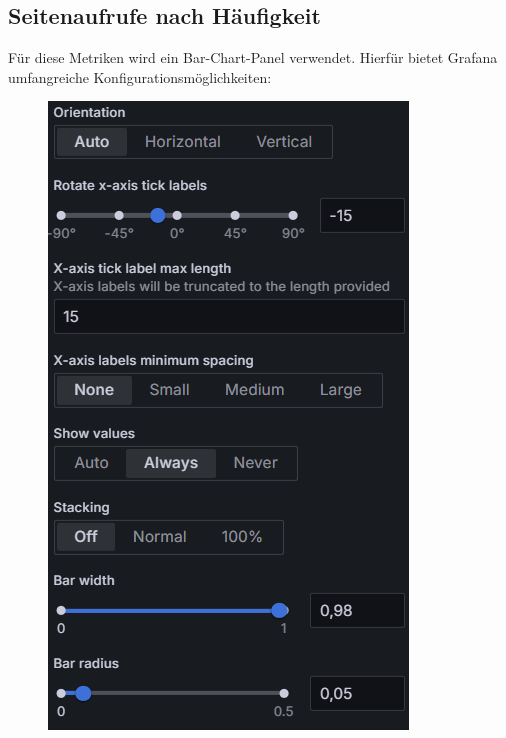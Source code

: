 \subsection{Seitenaufrufe nach Häufigkeit}
Für diese Metriken wird ein Bar-Chart-Panel verwendet. Hierfür bietet Grafana umfangreiche Konfigurationsmöglichkeiten: 

\begin{figure}[H]
    \centering
    \begin{minipage}{0.49\textwidth}
        \centering
        \includegraphics[width=\linewidth, keepaspectratio]{images/orientation.png}

\end{minipage}
\end{figure}
